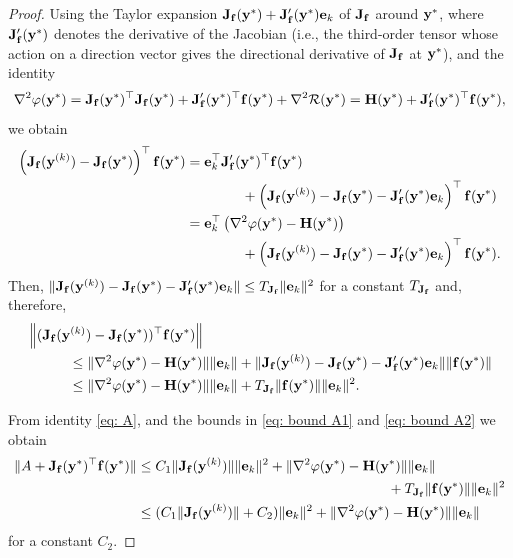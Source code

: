 \documentclass[onefignum,onetabnum]{siamart171218}
\newcommand{\bH}{{\bf H}}
\newcommand{\bJ}{{\bf J}}
\newcommand{\be}{{\bf e}}
\newcommand{\bff}{{\bf f}}
\newcommand{\by}{{\bf y}}
\begin{document}
\begin{proof}
Using the Taylor expansion $\bJ_{\bf f}(\by^*) + \bJ'_{\bf f}(\by^*)\be_k$  of $\bJ_{\bf f}$ around $\by^*$, where \(\bJ'_{\bf f}(\by^*)\) denotes the derivative of the Jacobian (i.e., the third-order tensor whose action on a direction vector gives the directional derivative of \(\bJ_{\bf f}\) at \(\by^*\)),
and the identity
\[
\nabla^2\varphi(\by^*)
= \bJ_{\bf f}(\by^*)^\top \bJ_{\bf f}(\by^*) + \bJ'_{\bf f}(\by^*)^\top\bff(\by^*) + \nabla^2 \mathcal{R}(\by^*) = \bH(\by^*) + \bJ'_{\bf f}(\by^*)^\top\bff(\by^*),
\]
we obtain
\begin{align*}
\left(\bJ_{\bf f}(\by^{(k)}) - \bJ_{\bf f}(\by^*) \right)^\top\bff(\by^*) &=  \be_k^\top \bJ'_{\bf f}(\by^*)^\top \bff(\by^*)  \\ & \qquad\qquad {} + \left(\bJ_{\bf f}(\by^{(k)}) - \bJ_{\bf f}(\by^*) - \bJ'_{\bf f}(\by^*)\be_k\right)^\top\bff(\by^*) \\
&= \be_k^\top \left(\nabla^2\varphi(\by^*)-\bH(\by^*)\right)  \\ & \qquad\qquad {} +\left(\bJ_{\bf f}(\by^{(k)}) - \bJ_{\bf f}(\by^*) - \bJ'_{\bf f}(\by^*)\be_k\right)^\top\bff(\by^*).
\end{align*}
Then, $\|\bJ_{\bf f}(\by^{(k)}) - \bJ_{\bf f}(\by^*) - \bJ'_{\bf f}(\by^*)\be_k\|\le T_{\bJ_\bff} \|\be_k\|^2$ for a constant $T_{\bJ_\bff}$ and, therefore,
\begin{align}\label{eq: bound A2}
    & \left\|(\bJ_{\bf f}(\by^{(k)}) -  \bJ_{\bf f}(\by^*))^\top \bff(\by^*)\right\| \nonumber\\
    & \quad\qquad \le \|\nabla^2\varphi(\by^*)-\bH(\by^*)\| \|\be_k\|+ \|\bJ_{\bf f}(\by^{(k)}) - \bJ_{\bf f}(\by^*) - \bJ'_{\bf f}(\by^*)\be_k\| \|\bff(\by^*)\|   \nonumber \\
    & \quad \qquad \le \|\nabla^2\varphi(\by^*)-\bH(\by^*)\| \|\be_k\|+  T_{\bJ_\bff} \|\bff(\by^*)\| \|\be_k\|^2.   
\end{align}

From identity \eqref{eq: A}, and the bounds in \eqref{eq: bound A1} and \eqref{eq: bound A2} we obtain
\begin{align}\label{eq: bound A}
    \| A+ \bJ_{\bf f}(\by^*)^\top \bff(\by^*)\| 
    & \le  C_1 \| \bJ_{\bf f}(\by^{(k)})\| \|\be_k\|^2 +\|\nabla^2\varphi(\by^*)-\bH(\by^*)\| \|\be_k\| \nonumber \\ & \qquad \qquad \qquad\qquad \qquad \qquad \qquad \qquad \qquad{} + T_{\bJ_\bff} \|\bff(\by^*)\| \|\be_k\|^2 \nonumber\\ 
    & \le (C_1 \| \bJ_{\bf f}(\by^{(k)})\| + C_2) \|\be_k\|^2 +\|\nabla^2\varphi(\by^*)-\bH(\by^*)\| \|\be_k\|
\end{align}
for a constant $C_2$.


\end{proof}
\end{document}
